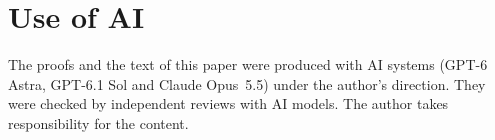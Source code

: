 \documentclass[11pt]{article}
\theoremstyle{definition}
\theoremstyle{remark}
\numberwithin{equation}{section}
\begin{document}


\section*{Use of AI}
The proofs and the text of this paper were produced with AI systems (GPT-6 Astra, GPT-6.1 Sol and Claude
Opus~5.5) under the author's direction. They were checked by independent reviews with AI models. The author
takes responsibility for the content.
\end{document}
